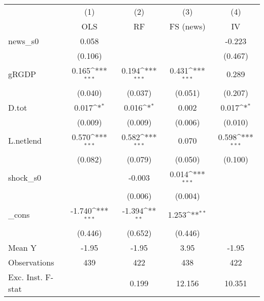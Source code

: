 {
\def\sym#1{\ifmmode^{#1}\else\(^{#1}\)\fi}
\begin{tabular}{l*{4}{c}}
\toprule
            &\multicolumn{1}{c}{(1)}&\multicolumn{1}{c}{(2)}&\multicolumn{1}{c}{(3)}&\multicolumn{1}{c}{(4)}\\
            &\multicolumn{1}{c}{OLS}&\multicolumn{1}{c}{RF}&\multicolumn{1}{c}{FS (news)}&\multicolumn{1}{c}{IV}\\
\midrule
news\_s0     &       0.058         &                     &                     &      -0.223         \\
            &     (0.106)         &                     &                     &     (0.467)         \\
\addlinespace
gRGDP       &       0.165\sym{***}&       0.194\sym{***}&       0.431\sym{***}&       0.289         \\
            &     (0.040)         &     (0.037)         &     (0.051)         &     (0.207)         \\
\addlinespace
D.tot       &       0.017\sym{*}  &       0.016\sym{*}  &       0.002         &       0.017\sym{*}  \\
            &     (0.009)         &     (0.009)         &     (0.006)         &     (0.010)         \\
\addlinespace
L.netlend   &       0.570\sym{***}&       0.582\sym{***}&       0.070         &       0.598\sym{***}\\
            &     (0.082)         &     (0.079)         &     (0.050)         &     (0.100)         \\
\addlinespace
shock\_s0    &                     &      -0.003         &       0.014\sym{***}&                     \\
            &                     &     (0.006)         &     (0.004)         &                     \\
\addlinespace
\_cons      &      -1.740\sym{***}&      -1.394\sym{**} &       1.253\sym{**} &                     \\
            &     (0.446)         &     (0.652)         &     (0.446)         &                     \\
\midrule
Mean Y      &       -1.95         &       -1.95         &        3.95         &       -1.95         \\
Observations&         439         &         422         &         438         &         422         \\
Exc. Inst. F-stat&                     &       0.199         &      12.156         &      10.351         \\
\bottomrule
\end{tabular}
}
